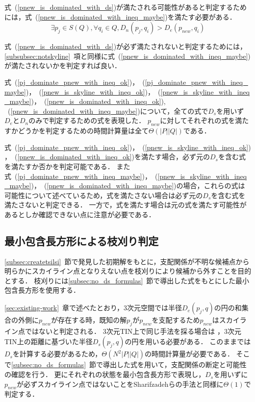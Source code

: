 \documentclass{fit}
\theoremstyle{definition}
\newcommand{\Sec}[1]{#1~章}
\newcommand{\Subsec}[1]{#1~節}
\newcommand{\Subsubsec}[1]{#1~項}
\newcommand{\Eq}[1]{式~(#1)}
\begin{document}
\Eq{\ref{pnew_is_dominated_with_ds}}が満たされる可能性があると判定するためには，\Eq{\ref{pnew_is_dominated_with_ineq_maybe}}を満たす必要がある．
\begin{equation}
  \label{pnew_is_dominated_with_ineq_maybe}
  \exists p_j \in S(Q), \forall q_i \in Q, D_n(p_j, q_i) > D_e(p_{new}, q_i)
\end{equation}

\Eq{\ref{pnew_is_dominated_with_ds}}が必ず満たされないと判定するためには，\Subsubsec{\ref{subsubsec:notskyline}}と同様に\Eq{\ref{pnew_is_dominated_with_ineq_maybe}}が満たされないかを判定すれば良い．

式~(\ref{pj_dominate_pnew_with_ineq_ok})，~(\ref{pj_dominate_pnew_with_ineq_maybe})，~(\ref{pnew_is_skyline_with_ineq_ok})，~(\ref{pnew_is_skyline_with_ineq_maybe})，~(\ref{pnew_is_dominated_with_ineq_ok}), ~(\ref{pnew_is_dominated_with_ineq_maybe})について，全ての式で$D_s$を用いず$D_e$と$D_n$のみで判定するための式を表現した．
$p_{new}$に対してそれぞれの式を満たすかどうかを判定するための時間計算量は全て$\Theta (|P||Q|)$である．

式~(\ref{pj_dominate_pnew_with_ineq_ok})，~(\ref{pnew_is_skyline_with_ineq_ok})，~(\ref{pnew_is_dominated_with_ineq_ok})を満たす場合，必ず元の$D_s$を含む式を満たすか否かを判定可能である．
また式~(\ref{pj_dominate_pnew_with_ineq_maybe})，~(\ref{pnew_is_skyline_with_ineq_maybe})，~(\ref{pnew_is_dominated_with_ineq_maybe})の場合，これらの式は可能性について述べているため，式を満たさない場合は必ず元の$D_s$を含む式を満たさないと判定できる．
一方で，式を満たす場合は元の式を満たす可能性があるとしか確認できない点に注意が必要である．


\subsection{最小包含長方形による枝刈り判定}\label{subsec:bmr}

\Subsec{\ref{subsec:createtsilsi}}で発見した初期解をもとに，支配関係が不明な候補点から明らかにスカイライン点となりえない点を枝刈りにより候補から外すことを目的とする．
枝刈りには\Subsec{\ref{subsec:no_ds_formulas}}で導出した式をもとにした最小包含長方形を使用する．

\Sec{\ref{sec:existing-work}}で述べたとおり，3次元空間では半径$D_e(p_j,q)$の円の和集合の外側に$p_{new}$が存在する時，既知の解$p_j$が$p_{new}$を支配するため$p_{new}$はスカイライン点ではないと判定される．
3次元TIN上で同じ手法を採る場合は ，3次元TIN上の距離に基づいた半径$D_s(p_j,q)$の円を用いる必要がある．
このままでは$D_s$を計算する必要があるため，$\Theta (N^2|P||Q|)$の時間計算量が必要である．
そこで\Subsec{\ref{subsec:no_ds_formulas}}で導出した式を用いて，支配関係の断定と可能性の確認を行う．
更にそれぞれの状態を最小包含長方形で表現し，$D_s$を用いずに$p_{new}$が必ずスカイライン点ではないことをSharifzadehらの手法と同様に$\Theta (1)$で判定する．
\end{document}
